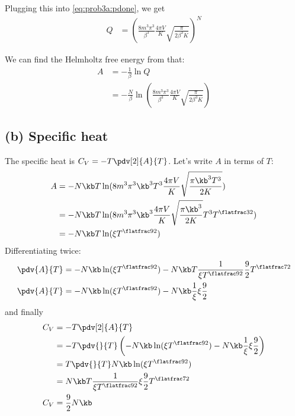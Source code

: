 \documentclass[../../PS3.tex]{subfiles}
\begin{document}
Plugging this into \eqref{eq:prob3a:pdone}, we get
\begin{align}
	Q &= \left( \frac{8 m^3 \pi^3 }{ \beta^3} \frac{4 \pi V}{K} \sqrt{\frac{\pi}{2 \beta^3 K} }\right)^N	
\end{align}

We can find the Helmholtz free energy from that:
\begin{align}
	A &= -\frac{1}{\beta} \ln{Q} \\
	&= - \frac{N}{\beta} \ln(\frac{8 m^3 \pi^3 }{ \beta^3} \frac{4 \pi V}{K} \sqrt{\frac{\pi}{2 \beta^3 K} })
\end{align}

\subsection*{(b) Specific heat}
The specific heat is $C_V = - T \pdv[2]{A}{T}$. Let's write $A$ in terms of $T$:
\begin{align}
	A &= - N \kb T \ln(8 m^3 \pi^3 \kb^3 T^3 \frac{4 \pi V}{K} \sqrt{\frac{\pi \kb^3 T^3}{2 K} }) \\
	&= - N \kb T \ln(8 m^3 \pi^3 \kb^3 \frac{4 \pi V}{K} \sqrt{\frac{\pi \kb^3}{2 K}} T^3 T^{\flatfrac32}) \\
	&= - N \kb T \ln(\xi T^{\flatfrac92})
\end{align}
Differentiating twice:
\begin{align}
	\pdv{A}{T} &= - N \kb \ln(\xi T ^{\flatfrac92}) - N \kb T \frac{1}{\xi T^{\flatfrac92}} \frac92 T^{\flatfrac72} \\ 
	\pdv{A}{T} &= - N \kb \ln(\xi T ^{\flatfrac92}) - N \kb \frac{1}{\xi} \xi \frac9	2  	
\end{align}
and finally
\begin{align}
	C_V &= - T\pdv[2]{A}{T} \\
	&= - T \pdv{}{T} \left( - N \kb \ln(\xi T ^{\flatfrac92}) - N \kb \frac{1}{\xi} \xi \frac9	2  	\right) \\
	&= T \pdv{}{T} N \kb \ln(\xi T^{\flatfrac92}) \\
	&= N \kb T \frac{1}{\xi T^{\flatfrac92}} \xi \frac92 T^{\flatfrac72} \\
	C_V &= \frac92 N \kb
\end{align}
\end{document}
